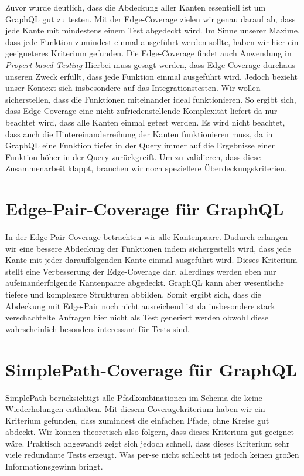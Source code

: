 Zuvor wurde deutlich, dass die Abdeckung aller Kanten essentiell ist um GraphQL gut zu testen.
Mit der Edge-Coverage zielen wir genau darauf ab, dass jede Kante mit mindestens einem Test abgedeckt wird.
Im Sinne unserer Maxime, dass jede Funktion zumindest einmal ausgeführt werden sollte, haben wir hier ein geeigneteres
Kriterium gefunden.
Die Edge-Coverage findet auch Anwendung in \textit{Propert-based Testing}\cite[vgl. D-RQ1 ]{property-based-testing}
Hierbei muss gesagt werden, dass Edge-Coverage durchaus unseren Zweck erfüllt, dass jede Funktion einmal ausgeführt wird.
Jedoch bezieht unser Kontext sich insbesondere auf das Integrationstesten.
Wir wollen sicherstellen, dass die Funktionen miteinander ideal funktionieren.
So ergibt sich, dass Edge-Coverage eine nicht zufriedenstellende Komplexität liefert da nur beachtet wird, dass alle Kanten einmal getest werden.
Es wird nicht beachtet, dass auch die Hintereinanderreihung der Kanten funktionieren muss, da in GraphQL eine Funktion tiefer in der Query immer auf die
Ergebnisse einer Funktion höher in der Query zurückgreift.
Um zu validieren, dass diese Zusammenarbeit klappt, brauchen wir noch speziellere Überdeckungskriterien.

\section{Edge-Pair-Coverage für GraphQL}

In der Edge-Pair Coverage betrachten wir alle Kantenpaare.
Dadurch erlangen wir eine bessere Abdeckung der Funktionen indem sichergestellt wird, dass jede Kante mit jeder darauffolgenden Kante einmal ausgeführt wird.
Dieses Kriterium stellt eine Verbesserung der Edge-Coverage dar, allerdings werden eben nur aufeinanderfolgende Kantenpaare abgedeckt.
GraphQL kann aber wesentliche tiefere und komplexere Strukturen abbilden.
Somit ergibt sich, dass die Abdeckung mit Edge-Pair noch nicht ausreichend ist da insbesondere stark verschachtelte Anfragen
hier nicht als Test generiert werden obwohl diese wahrscheinlich besonders interessant für Tests sind.

\section{SimplePath-Coverage für GraphQL}

SimplePath berücksichtigt alle Pfadkombinationen im Schema die keine Wiederholungen enthalten.
Mit diesem Coveragekriterium haben wir ein Kriterium gefunden, dass zumindest die einfachen Pfade, ohne Kreise gut abdeckt.
Wir können theoretisch also folgern, dass dieses Kriterium gut geeignet wäre.
Praktisch angewandt zeigt sich jedoch schnell, dass dieses Kriterium sehr viele redundante Tests erzeugt.
Was per-se nicht schlecht ist jedoch keinen großen Informationsgewinn bringt.

